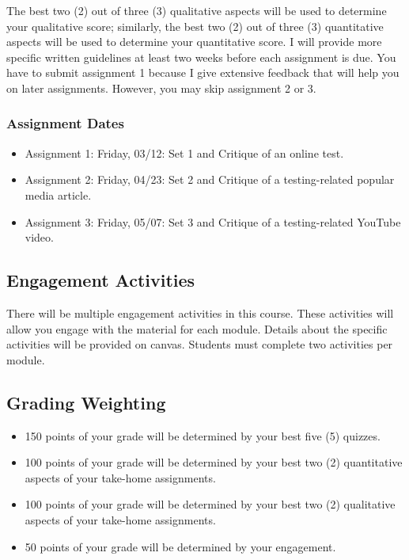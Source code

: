 \documentclass[11pt,]{article}
\providecommand{\tightlist}{%
  \setlength{\itemsep}{0pt}\setlength{\parskip}{0pt}}
\begin{document}
The best two (2) out of three (3) qualitative aspects will be used to
determine your qualitative score; similarly, the best two (2) out of
three (3) quantitative aspects will be used to determine your
quantitative score. I will provide more specific written guidelines at
least two weeks before each assignment is due. You have to submit
assignment 1 because I give extensive feedback that will help you on
later assignments. However, you may skip assignment 2 or 3.

\hypertarget{assignment-dates}{%
\subsubsection{Assignment Dates}\label{assignment-dates}}

\begin{itemize}
\item
  Assignment 1: Friday, 03/12: Set 1 and Critique of an online test.
\item
  Assignment 2: Friday, 04/23: Set 2 and Critique of a testing-related
  popular media article.
\item
  Assignment 3: Friday, 05/07: Set 3 and Critique of a testing-related
  YouTube video.
\end{itemize}

\hypertarget{engagement-activities}{%
\subsection{Engagement Activities}\label{engagement-activities}}

There will be multiple engagement activities in this course. These
activities will allow you engage with the material for each module.
Details about the specific activities will be provided on canvas.
Students must complete two activities per module.

\hypertarget{grading-weighting}{%
\subsection{Grading Weighting}\label{grading-weighting}}

\begin{itemize}
\tightlist
\item
  150 points of your grade will be determined by your best five (5)
  quizzes.
\item
  100 points of your grade will be determined by your best two (2)
  quantitative aspects of your take-home assignments.
\item
  100 points of your grade will be determined by your best two (2)
  qualitative aspects of your take-home assignments.
\item
  50 points of your grade will be determined by your engagement.
\end{itemize}
\end{document}
